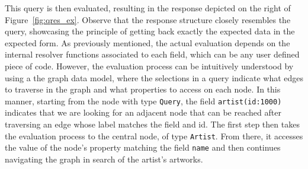 This query is then evaluated, resulting in the response
depicted on the right of Figure~\ref{fig:qres_ex}. Observe that the
response structure closely
resembles the query, showcasing the \gql principle of getting back exactly the expected data 
in the expected form. As previously mentioned, the actual evaluation depends on the
internal resolver functions associated to each field, which can be any
user defined piece of code.
However, the evaluation process can be intuitively understood by using a the graph data model, where
the selections in a query indicate what edges to traverse in the graph and 
what properties to access on each node. In this manner, starting from the
node with type \texttt{Query}, the field \texttt{artist(id:1000)} indicates that 
we are looking for an adjacent node that can be reached after traversing an edge whose label matches the
field and id. The first step then takes the evaluation process to the central
node, of type \texttt{Artist}.  From there, it accesses the value
of the node's property matching the field \texttt{name} and then
continues navigating the graph in search of the artist's artworks.

